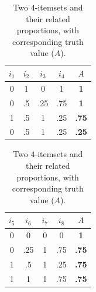 \begin{table}[h!]
\centering
  \begin{tabular}{ c c  c  c  c }
\toprule
 $i_1 $ & $i_2$ & $i_3$ & $i_4$ & $A$\\
  \midrule
    0 & 1 & 0 & 1 & \textbf{1} \\
    0 & .5 & .25 & .75 & \textbf{1} \\
    1 & .5 & 1 & .25 & \textbf{.75} \\
    0 & .5 & 1 & .25 & \textbf{.25} \\
\bottomrule
\end{tabular}
\quad
  \begin{tabular}{ c c  c  c  c }
\toprule
 $i_5 $ & $i_6$ & $i_7$ & $i_8$ & $A$\\
  \midrule
    0 & 0 & 0 & 0 & \textbf{1} \\
    0 & .25 & 1 & .75 & \textbf{.75} \\
    1 & .5 & 1 & .25 & \textbf{.75} \\
    1 & 1 & 1 & .75 & \textbf{.75} \\
\bottomrule
\end{tabular}

\caption{Two $4$-itemsets and their related proportions, with corresponding
  truth value ($A$).}
\label{TAB:lexicographic_order}
\end{table}

